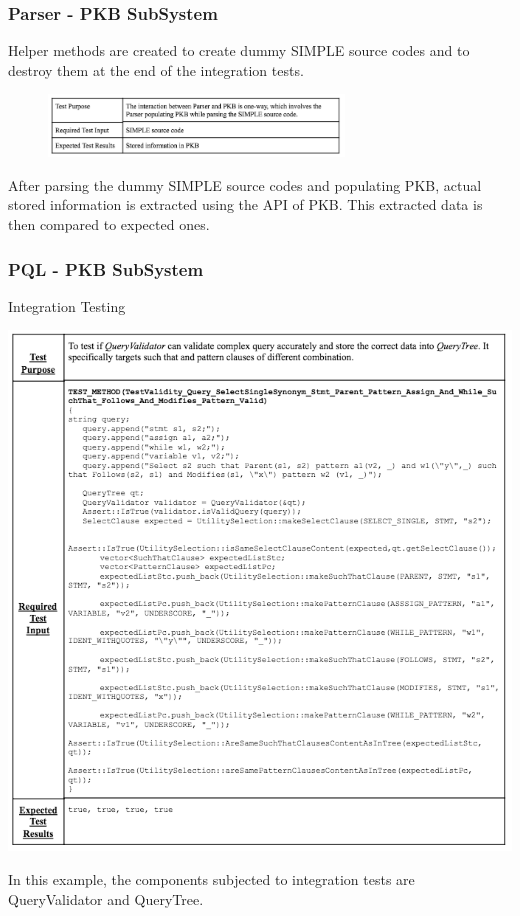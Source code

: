 \documentclass[12pt]{article}
\begin{document}
{{{{{{{{{{\subsubsection{Parser - PKB SubSystem}
Helper methods are created to create dummy SIMPLE source codes and to destroy them at the end of the integration tests.
\begin{figure}[!htbp]
  \centering 
 \includegraphics[width=0.7\textwidth]{Testssss.png}
\end{figure}
\newline
After parsing the dummy SIMPLE source codes and populating PKB, actual stored information is extracted using the API of PKB. This extracted data is then compared to expected ones.

\subsubsection{PQL - PKB SubSystem}
\begin{table}[!htbp]
  \centering 
  \caption{Integration Testing}
 \includegraphics[width=1.0\textwidth]{IntegrationTesting1.png}
\end{table}
 In this example, the components subjected to integration tests are QueryValidator and QueryTree.
}}}}}}}}}}
\end{document}
